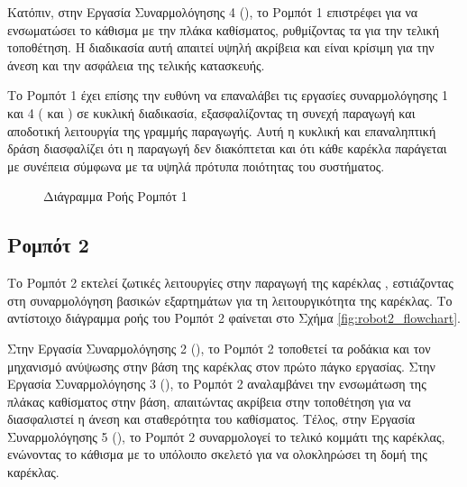 Κατόπιν, στην Εργασία Συναρμολόγησης 4 (), το Ρομπότ 1 επιστρέφει για να ενσωματώσει το κάθισμα με την πλάκα καθίσματος, ρυθμίζοντας τα για την τελική τοποθέτηση. Η διαδικασία αυτή απαιτεί υψηλή ακρίβεια και είναι κρίσιμη για την άνεση και την ασφάλεια της τελικής κατασκευής.

Το Ρομπότ 1 έχει επίσης την ευθύνη να επαναλάβει τις εργασίες συναρμολόγησης 1 και 4 ( και ) σε κυκλική διαδικασία, εξασφαλίζοντας τη συνεχή παραγωγή και αποδοτική λειτουργία της γραμμής παραγωγής. Αυτή η κυκλική και επαναληπτική δράση διασφαλίζει ότι η παραγωγή δεν διακόπτεται και ότι κάθε καρέκλα παράγεται με συνέπεια σύμφωνα με τα υψηλά πρότυπα ποιότητας του συστήματος.

\begin{figure}[H]
    \centering
    \caption{Διάγραμμα Ροής Ρομπότ 1}
    \label{fig:robot1_flowchart}
\end{figure}

\subsection{Ρομπότ 2}
\noindent Το Ρομπότ 2 εκτελεί ζωτικές λειτουργίες στην παραγωγή της καρέκλας , εστιάζοντας στη συναρμολόγηση βασικών εξαρτημάτων για τη λειτουργικότητα της καρέκλας.  Το αντίστοιχο διάγραμμα ροής του Ρομπότ 2 φαίνεται στο Σχήμα \ref{fig:robot2_flowchart}.

Στην Εργασία Συναρμολόγησης 2 (), το Ρομπότ 2 τοποθετεί τα ροδάκια και τον μηχανισμό ανύψωσης στην βάση της καρέκλας στον πρώτο πάγκο εργασίας. Στην Εργασία Συναρμολόγησης 3 (), το Ρομπότ 2 αναλαμβάνει την ενσωμάτωση της πλάκας καθίσματος στην βάση, απαιτώντας ακρίβεια στην τοποθέτηση για να διασφαλιστεί η άνεση και σταθερότητα του καθίσματος. Τέλος, στην Εργασία Συναρμολόγησης 5 (), το Ρομπότ 2 συναρμολογεί το τελικό κομμάτι της καρέκλας, ενώνοντας το κάθισμα με το υπόλοιπο σκελετό για να ολοκληρώσει τη δομή της καρέκλας.

